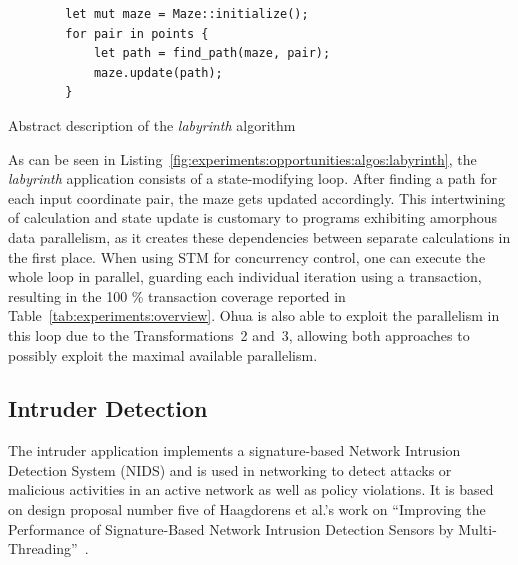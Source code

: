 \begin{listing}
    \begin{verbatim}
        let mut maze = Maze::initialize();
        for pair in points {
            let path = find_path(maze, pair);
            maze.update(path);
        }
    \end{verbatim}
    \caption{Abstract description of the \emph{labyrinth} algorithm}
    \label{fig:experiments:opportunities:algos:labyrinth}
\end{listing}

As can be seen in Listing~\ref{fig:experiments:opportunities:algos:labyrinth}, the \emph{labyrinth} application consists of a state-modifying loop.
After finding a path for each input coordinate pair, the maze gets updated accordingly.
This intertwining of calculation and state update is customary to programs exhibiting amorphous data parallelism, as it creates these dependencies between separate calculations in the first place.
When using STM for concurrency control, one can execute the whole loop in parallel, guarding each individual iteration using a transaction, resulting in the 100 \% transaction coverage reported in Table~\ref{tab:experiments:overview}.
Ohua is also able to exploit the parallelism in this loop due to the Transformations~2 and~3, allowing both approaches to possibly exploit the maximal available parallelism.


\subsection{Intruder Detection}
\label{sec:experiments:intruder}

The intruder application implements a signature-based Network Intrusion Detection System (NIDS) and is used in networking to detect attacks or malicious activities in an active network as well as policy violations.
It is based on design proposal number five of Haagdorens et al.'s work on \enquote{Improving the Performance of Signature-Based Network Intrusion Detection Sensors by Multi-Threading}~\cite{haagdorens2004improving}.

